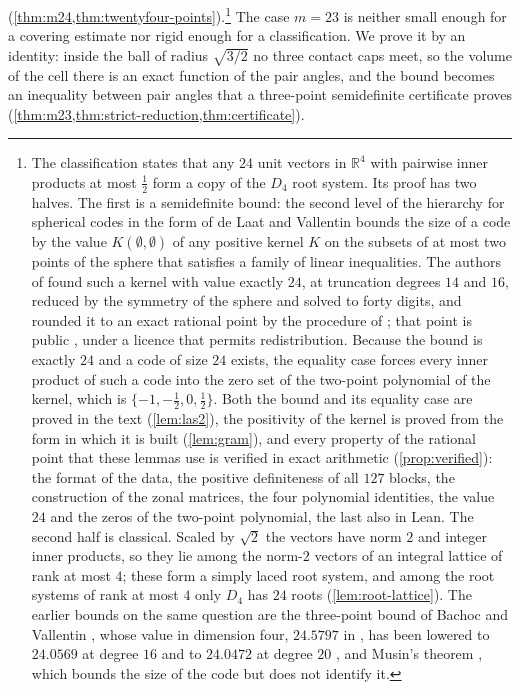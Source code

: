 \documentclass[11pt,reqno]{amsart}
\renewcommand{\_}{\origunderscore\allowbreak}
\numberwithin{equation}{section}
\theoremstyle{plain}
\theoremstyle{definition}
\theoremstyle{remark}
\begin{document}
(\cref{thm:m24,thm:twentyfour-points}).\footnote{The classification
  states that any $24$ unit vectors in $\mathbb{R}^4$ with pairwise inner
  products at most $\frac12$ form a copy of the $D_4$ root system. Its
  proof has two halves. The first is a semidefinite bound: the second level
  of the hierarchy for spherical codes in the form of de Laat and Vallentin
  \cite{dLV15} bounds the size of a code by the value $K(\emptyset,\emptyset)$
  of any positive kernel $K$ on the subsets of at most two points of the
  sphere that satisfies a family of linear inequalities. The authors of
  \cite{LLM24} found such a kernel with value exactly $24$, at truncation
  degrees $14$ and $16$, reduced by the symmetry of the sphere and solved to
  forty digits, and rounded it to an exact rational point by the procedure
  of \cite{CdLL24}; that point is public \cite{LLM24data}, under a licence
  that permits redistribution. Because the bound is exactly $24$ and a code
  of size $24$ exists, the equality case forces every inner product of such
  a code into the zero set of the two-point polynomial of the kernel, which
  is $\{-1,-\frac12,0,\frac12\}$. Both the bound and its equality case are
  proved in the text (\cref{lem:las2}), the positivity of the kernel is
  proved from the form in which it is built (\cref{lem:gram}), and every
  property of the rational point that these lemmas use is verified in exact
  arithmetic (\cref{prop:verified}): the format of the data, the positive
  definiteness of all $127$ blocks, the construction of the zonal matrices,
  the four polynomial identities, the value $24$ and the zeros of the
  two-point polynomial, the last also in Lean. The second half is
  classical. Scaled by $\sqrt2$ the vectors have norm $2$ and integer inner
  products, so they lie among the norm-$2$ vectors of an integral lattice
  of rank at most $4$; these form a simply laced root system, and among the
  root systems of rank at most $4$ only $D_4$ has $24$ roots
  (\cref{lem:root-lattice}). The earlier bounds on the same question are the
  three-point bound of Bachoc and Vallentin \cite{BV08}, whose value in
  dimension four, $24.5797$ in \cite{BV08}, has been lowered to $24.0569$
  at degree $16$ \cite{MV10,MO18} and to $24.0472$ at degree $20$
  \cite{Lei25}, and Musin's theorem \cite{Mus08}, which bounds the size of
  the code but does not identify it.} The case $m=23$ is neither small
enough for a covering estimate nor rigid enough for a classification. We
prove it by an identity: inside the ball of radius $\sqrt{3/2}$ no three
contact caps meet, so the volume of the cell there is an exact function
of the pair angles, and the bound becomes an inequality between pair
angles that a three-point semidefinite certificate proves
(\cref{thm:m23,thm:strict-reduction,thm:certificate}).
\end{document}
